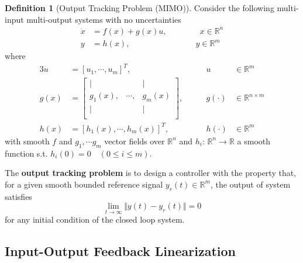 \documentclass[11pt, a4paper, oneside, openany, reqno]{book}
\theoremstyle{definition}
\newtheorem{definition}[theorem]{Definition}
\theoremstyle{remark}
\numberwithin{equation}{chapter} %
\newcommand{\R}{\ensuremath{{\mathbb R}}}
\begin{document}
\begin{definition}[Output Tracking Problem (MIMO)]
	Consider the following multi-input multi-output systems with no uncertainties
	\begin{equation} \begin{split}\label{mimosys}
	\dot{x}&= f(x)+g(x)u,  \qquad \qquad x \in \R^n \\
	y&=h(x), \qquad\qquad\qquad\qquad y \in \R^m 
	\end{split}\end{equation} where
	\begin{alignat*}{3}
	u&=\left[u_1 ,\cdots ,u_m\right]^T ,  \qquad & u & \in \R^m \\
	g(x)&=\left[ \begin{array}{ccc}
	\vert & & \vert \\
	g_1 (x), & \cdots , & g_m (x) \\
	\vert & & \vert \\
	\end{array} \right],   \qquad & g(\cdot) & \in \R^{n \times m} \\
	h(x)&=\left[h_1 (x) ,\cdots ,h_m (x) \right]^T , \qquad & h(\cdot) & \in \R^m 
	\end{alignat*} 
	with smooth $ f $ and $ g_1 ,\cdots g_m $ vector fields over $\R^n$ 
	and $ h_i $: $\R^n \rightarrow \R$ 
	a smooth function s.t. $ h_i(0)=0 \quad (0 \leq i \leq m) $. 

	The \textbf{output tracking problem} is to design a controller with the property that,
	for a given smooth bounded reference signal $ y_r(t) \in \R^m$, the output of system satisfies 
	\[ \lim_{t \to \infty}\Vert y(t)-y_r(t) \Vert = 0 \]
	for any initial condition of the closed loop system.
\end{definition}

\subsection{Input-Output Feedback Linearization}
\end{document}
